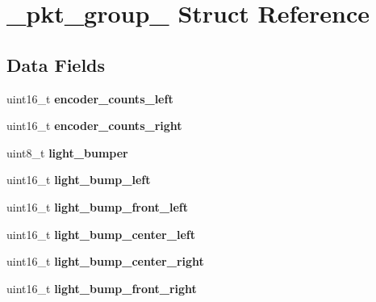 \hypertarget{struct__pkt__group__101}{}\section{\+\_\+pkt\+\_\+group\+\_ Struct Reference}
\label{struct__pkt__group__101}
\subsection*{Data Fields}
\begin{DoxyCompactItemize}
\item 
\hypertarget{group__roomba-lib_gac67c2df811fa6b016babff589d49a334}{}uint16\+\_\+t {\bfseries encoder\+\_\+counts\+\_\+left}\label{group__roomba-lib_gac67c2df811fa6b016babff589d49a334}

\item 
\hypertarget{group__roomba-lib_gaf241e5ac898f0af032ef9a2fda8435cf}{}uint16\+\_\+t {\bfseries encoder\+\_\+counts\+\_\+right}\label{group__roomba-lib_gaf241e5ac898f0af032ef9a2fda8435cf}

\item 
\hypertarget{group__roomba-lib_ga9d8c0585cdfc7fd3b618fc69a747d216}{}uint8\+\_\+t {\bfseries light\+\_\+bumper}\label{group__roomba-lib_ga9d8c0585cdfc7fd3b618fc69a747d216}

\item 
\hypertarget{group__roomba-lib_gae55a54b9b25669739aa113d402a4e2d2}{}uint16\+\_\+t {\bfseries light\+\_\+bump\+\_\+left}\label{group__roomba-lib_gae55a54b9b25669739aa113d402a4e2d2}

\item 
\hypertarget{group__roomba-lib_ga30567925e0f9765463335c092f83229c}{}uint16\+\_\+t {\bfseries light\+\_\+bump\+\_\+front\+\_\+left}\label{group__roomba-lib_ga30567925e0f9765463335c092f83229c}

\item 
\hypertarget{group__roomba-lib_gaeeb1ac2f38084972135c8cc8ddb9b245}{}uint16\+\_\+t {\bfseries light\+\_\+bump\+\_\+center\+\_\+left}\label{group__roomba-lib_gaeeb1ac2f38084972135c8cc8ddb9b245}

\item 
\hypertarget{group__roomba-lib_ga82e8b7ec16d40c7eb6a44a692ec9223b}{}uint16\+\_\+t {\bfseries light\+\_\+bump\+\_\+center\+\_\+right}\label{group__roomba-lib_ga82e8b7ec16d40c7eb6a44a692ec9223b}

\item 
\hypertarget{group__roomba-lib_ga60db7aefc4a621e07174101743d3e62e}{}uint16\+\_\+t {\bfseries light\+\_\+bump\+\_\+front\+\_\+right}\label{group__roomba-lib_ga60db7aefc4a621e07174101743d3e62e}


\end{DoxyCompactItemize}
